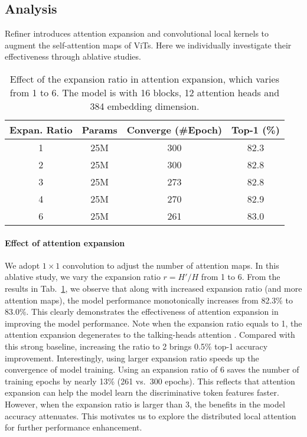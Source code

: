 \subsection{Analysis}
\label{exp:analysis}
Refiner introduces attention expansion and convolutional local kernels to augment the self-attention maps of ViTs. Here we individually investigate their effectiveness through ablative studies. 



\begin{table}[h]
    \footnotesize
    \setlength\tabcolsep{2.1pt}
    \centering
    \caption{\small  Effect of the expansion ratio in  attention expansion, which varies from 1 to 6. The model is \OURS{} with 16 blocks, 12 attention heads and 384 embedding dimension. }
\label{tab:attn_expansion_ratio}
\begin{tabular}{cccc} \toprule
    Expan. Ratio & Params & Converge  (\#Epoch) &  Top-1 (\%)\\ \midrule
     1 & 25M & 300 & 82.3\\ 
    2 & 25M & 300 & 82.8\\ 
    3 & 25M & 273 & 82.8\\
     4 & 25M & 270 & 82.9\\
    6 & 25M & 261 & 83.0\\ \bottomrule
    \end{tabular}
\end{table}


\paragraph{Effect of attention   expansion} We adopt $1\times 1$ convolution to adjust the number of attention maps. In this ablative study, we vary the expansion ratio $r = H'/H$ from 1 to 6. From the results     in Tab.~\ref{tab:attn_expansion_ratio}, we observe that along with    increased expansion ratio (and more attention maps), the model performance   monotonically increases from 82.3\% to 83.0\%. This clearly demonstrates the effectiveness of attention expansion in improving the model performance. Note when the expansion ratio equals to 1, the attention expansion degenerates to the talking-heads attention \cite{shazeer2020talking,zhou2021deepvit}. Compared with this strong baseline, increasing the ratio to 2 brings 0.5\% top-1 accuracy improvement. Interestingly, using larger expansion ratio speeds up the convergence of model training. Using an expansion ratio of 6 saves the number of training epochs by nearly 13\% (261 vs.\ 300 epochs). This reflects that attention expansion can help   the  model learn the discriminative token features faster. However, when the expansion ratio is larger than 3, the benefits in the model accuracy attenuates. This motivates us to explore the distributed local attention for further performance enhancement.






